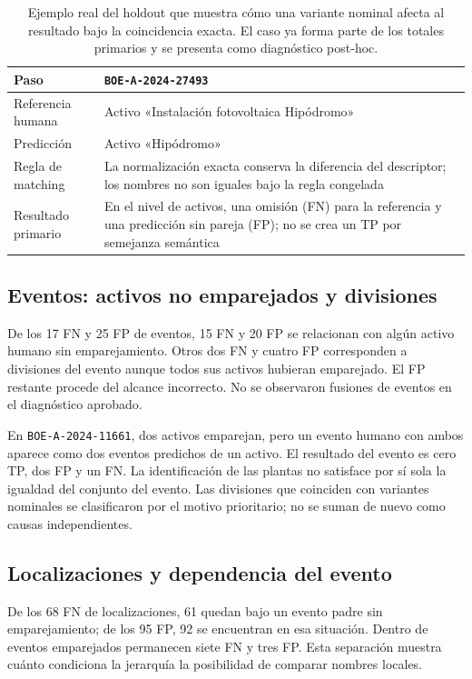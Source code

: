 \begin{table}[htbp]
\centering
\small
\renewcommand{\arraystretch}{1.2}
\begin{tabular}{L{2.4cm} L{10.0cm}}
\hline
Paso & \texttt{BOE-A-2024-27493} \\
\hline
Referencia humana & Activo «Instalación fotovoltaica Hipódromo» \\
Predicción & Activo «Hipódromo» \\
Regla de matching & La normalización exacta conserva la diferencia del descriptor; los nombres no son iguales bajo la regla congelada \\
Resultado primario & En el nivel de activos, una omisión (FN) para la referencia y una predicción sin pareja (FP); no se crea un TP por semejanza semántica \\
\hline
\end{tabular}
\caption[Caso ilustrativo de referencia, predicción y matching]{Ejemplo real
del holdout que muestra cómo una variante nominal afecta al resultado bajo la
coincidencia exacta. El caso ya forma parte de los totales primarios y se
presenta como diagnóstico post-hoc.}
\label{tab:caso-hipodromo}
\end{table}

\subsection{Eventos: activos no emparejados y divisiones}
De los 17 FN y 25 FP de eventos, 15 FN y 20 FP se relacionan con algún
activo humano sin emparejamiento. Otros dos FN y cuatro FP corresponden a divisiones
del evento aunque todos sus activos hubieran emparejado. El FP restante
procede del alcance incorrecto. No se observaron fusiones de eventos en el
diagnóstico aprobado.

En \texttt{BOE-A-2024-11661}, dos activos emparejan, pero un evento humano
con ambos aparece como dos eventos predichos de un activo. El resultado
del evento es cero TP, dos FP y un FN. La identificación de las plantas
no satisface por sí sola la igualdad del conjunto del evento.
Las divisiones que coinciden con variantes nominales se clasificaron por
el motivo prioritario; no se suman de nuevo como causas independientes.

\subsection{Localizaciones y dependencia del evento}
De los 68 FN de localizaciones, 61 quedan bajo un evento padre sin emparejamiento;
de los 95 FP, 92 se encuentran en esa situación. Dentro de eventos
emparejados permanecen siete FN y tres FP. Esta separación muestra cuánto
condiciona la jerarquía la posibilidad de comparar nombres locales.

